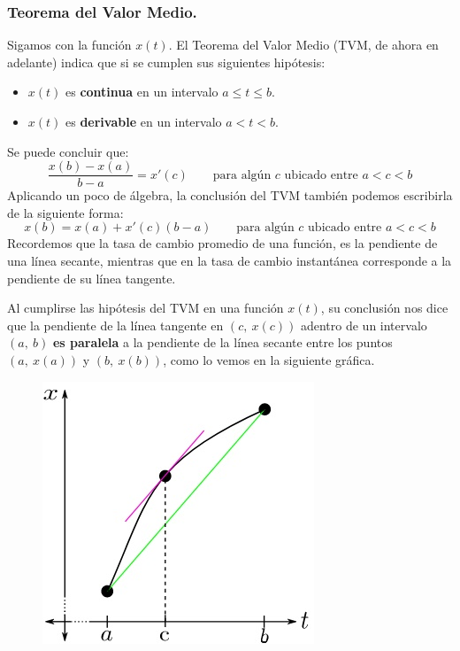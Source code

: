 \documentclass[12pt]{article}
\begin{document}
\subsubsection{Teorema del Valor Medio.}

Sigamos con la función $x(t)$. El Teorema del Valor Medio (TVM, de ahora en adelante) indica que si se cumplen sus siguientes hipótesis:

\begin{itemize}
\item $x(t)$ es \textbf{continua} en un intervalo $a \leq t \leq b$.
\item $x(t)$ es \textbf{derivable} en un intervalo $a < t < b$.
\end{itemize}

Se puede concluir que:
\[
	\frac{x(b) - x(a)}{b - a} = x'(c) \qquad
	\text{para algún } c \text{ ubicado entre } a < c < b
\]
Aplicando un poco de álgebra, la conclusión del TVM también podemos escribirla de la siguiente forma:
\[
  x(b) = x(a) + x'(c)(b - a) \qquad \text{para algún } c \text{ ubicado entre } a < c < b
\]
Recordemos que la tasa de cambio promedio de una función, es la pendiente de una línea secante, mientras que en la tasa de cambio instantánea corresponde a la pendiente de su línea tangente. 

Al cumplirse las hipótesis del TVM en una función $x(t)$, su conclusión nos dice que la pendiente de la línea tangente en $(c, \ x(c))$ adentro de un intervalo $(a, \ b)$ \textbf{es paralela} a la pendiente de la línea secante entre los puntos $(a, \ x(a))$ y $(b, \ x(b))$, como lo vemos en la siguiente gráfica.

\begin{figure}[hbt!]
\centering
\includegraphics[scale=0.5]{img/mean-value-theo.jpg}
\end{figure}
\end{document}
